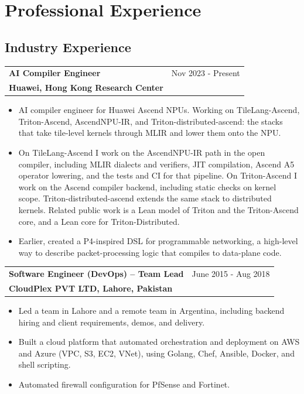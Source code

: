 \section{Professional Experience}

\subsection{Industry Experience}

\begin{tabularx}{\linewidth}{@{}X r@{}}
    \textbf{AI Compiler Engineer} & Nov 2023 - Present \\[3.75pt]
    \textbf{Huawei, Hong Kong Research Center} &
\end{tabularx}\nopagebreak
\vspace{\glueexpr -\parskip + 2pt\relax}
\begin{itemize}[nosep,after=\strut, leftmargin=1em, itemsep=3pt]
    \item[--] AI compiler engineer for Huawei Ascend NPUs.
    Working on TileLang-Ascend, Triton-Ascend, \mbox{AscendNPU-IR}, and Triton-distributed-ascend:
    the stacks that take tile-level kernels through MLIR and lower them onto the NPU.
    \item[--] On TileLang-Ascend I work on the \mbox{AscendNPU-IR} path in the open compiler,
    including MLIR dialects and verifiers, JIT compilation, Ascend A5
    operator lowering, and the tests and CI for that pipeline. On Triton-Ascend I work
    on the Ascend compiler backend, including static checks on kernel scope. Triton-distributed-ascend
    extends the same stack to distributed kernels. Related public work is a Lean model
    of Triton and the Triton-Ascend core, and a Lean core for Triton-Distributed.
    \item[--] Earlier, created a P4-inspired DSL for programmable networking, a high-level
    way to describe packet-processing logic that compiles to data-plane code.
\end{itemize}

\begin{tabularx}{\linewidth}{@{}X r@{}}
    \textbf{Software Engineer (DevOps) – Team Lead} & June 2015 - Aug 2018 \\[3.75pt]
    \textbf{CloudPlex PVT LTD, Lahore, Pakistan} &
\end{tabularx}\nopagebreak
\vspace{\glueexpr -\parskip + 2pt\relax}
\begin{itemize}[nosep,after=\strut, leftmargin=1em, itemsep=3pt]
    \item[--] Led a team in Lahore and a remote team in Argentina, including backend hiring and client requirements, demos, and delivery.
    \item[--] Built a cloud platform that automated orchestration and deployment on AWS and Azure (VPC, S3, EC2, VNet), using Golang, Chef, Ansible, Docker, and shell scripting.
    \item[--] Automated firewall configuration for PfSense and Fortinet.
\end{itemize}

